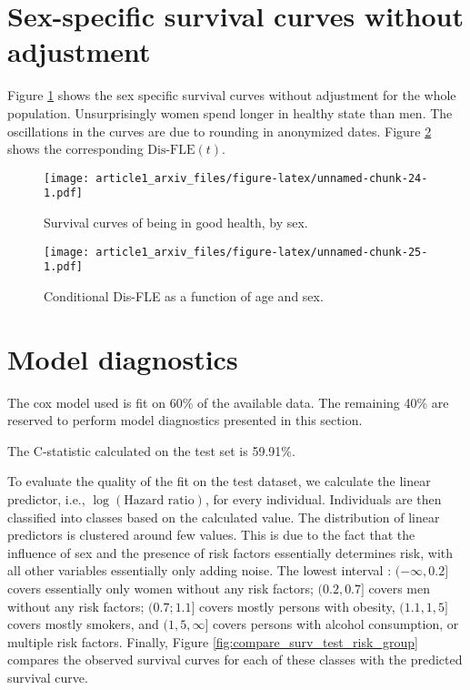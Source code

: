 \documentclass{article}
\begin{document}
\newpage

\hypertarget{sex-specific-survival-curves-without-adjustment}{%
\section{Sex-specific survival curves without
adjustment}\label{sex-specific-survival-curves-without-adjustment}}

Figure \ref{fig:health-surv-curve-nocov} shows the sex specific survival
curves without adjustment for the whole population. Unsurprisingly women
spend longer in healthy state than men. The oscillations in the curves
are due to rounding in anonymized dates. Figure
\ref{fig:health-expect-curve-nocov} shows the corresponding
\(\text{Dis-FLE}(t)\).

\begin{figure}
\centering
\texttt{[image: article1\_arxiv\_files/figure-latex/unnamed-chunk-24-1.pdf]}
\caption{\label{fig:health-surv-curve-nocov}Survival curves of being in
good health, by sex.}
\end{figure}

\begin{figure}
\centering
\texttt{[image: article1\_arxiv\_files/figure-latex/unnamed-chunk-25-1.pdf]}
\caption{\label{fig:health-expect-curve-nocov}Conditional Dis-FLE as a
function of age and sex.}
\end{figure}

\newpage

\hypertarget{model-diagnostics}{%
\section{Model diagnostics}\label{model-diagnostics}}

The cox model used is fit on 60\% of the available data. The remaining
40\% are reserved to perform model diagnostics presented in this
section.

The C-statistic calculated on the test set is 59.91\%.

To evaluate the quality of the fit on the test dataset, we calculate the
linear predictor, i.e., \(\log(\text{Hazard ratio})\), for every
individual. Individuals are then classified into classes based on the
calculated value. The distribution of linear predictors is clustered
around few values. This is due to the fact that the influence of sex and
the presence of risk factors essentially determines risk, with all other
variables essentially only adding noise. The lowest interval :
\((-\infty, 0.2]\) covers essentially only women without any risk
factors; \((0.2, 0.7]\) covers men without any risk factors;
\((0.7; 1.1]\) covers mostly persons with obesity, \((1.1, 1,5]\) covers
mostly smokers, and \((1,5, \infty]\) covers persons with alcohol
consumption, or multiple risk factors. Finally, Figure
\ref{fig:compare_surv_test_risk_group} compares the observed survival
curves for each of these classes with the predicted survival curve.
\end{document}
